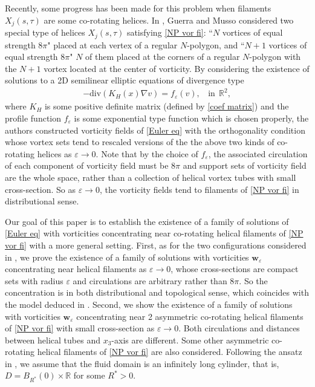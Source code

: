 \documentclass[12pt,reqno]{amsart}
\numberwithin{equation}{section}
\theoremstyle{definition}
\theoremstyle{remark}
\begin{document}
Recently, some progress has been made  for this problem when  filaments $ X_j(s, \tau) $ are some co-rotating helices. In \cite{GM2}, Guerra and Musso considered two special type of  helices $ X_j(s, \tau) $ satisfying \eqref{NP vor fi}: ``$ N $  vortices of equal strength $ 8\pi $" placed at each vertex of a regular $ N $-polygon, and ``$ N + 1 $ vortices   of equal strength $ 8\pi $" $ N $ of them placed at the corners of a regular $ N $-polygon with the $ N + 1 $ vortex   located at the center of vorticity. By considering the existence of solutions to a 2D semilinear elliptic equations of divergence type
\begin{equation*} 
\begin{split}
-\text{div}\left(K_H(x)\nabla v\right)=f_\varepsilon(v) ,\ \ \ \ \text{in}\ \ \mathbb{R}^2,
\end{split}
\end{equation*}
where $ K_H $ is some positive definite matrix (defined by \eqref{coef matrix}) and the profile function $ f_\varepsilon $ is some exponential type function which is chosen properly, the authors constructed vorticity fields of \eqref{Euler eq} with the orthogonality condition whose vortex sets tend to rescaled versions of the   the above two kinds of co-rotating helices as $ \varepsilon\to0. $ Note that by the choice of $ f_\varepsilon $, the associated circulation of each component of vorticity field must be $ 8\pi $ and  support sets of vorticity field are the whole space, rather than a collection of helical vortex tubes with small cross-section. So as $ \varepsilon\to0 $, the vorticity fields tend to filaments of \eqref{NP vor fi} in distributional sense.

Our goal of this paper is to establish the existence of a family of solutions of \eqref{Euler eq}   with vorticities concentrating near co-rotating helical filaments of  \eqref{NP vor fi} with a more general setting. First, as for the two configurations considered in \cite{GM2}, we prove the existence of a family of solutions with vorticities $ \textbf{w}_\varepsilon $ concentrating near helical filaments as $ \varepsilon\to0 $, whose cross-sections are   compact sets with radius $ \varepsilon $ and circulations are arbitrary rather than $8\pi$. So the concentration is in both distributional and topological sense, which coincides with the model deduced in \cite{KMD}. Second, we show the existence of a family of solutions with vorticities $ \textbf{w}_\varepsilon $ concentrating near 2 asymmetric co-rotating helical filaments of \eqref{NP vor fi} with small cross-section as $ \varepsilon\to0 $. Both circulations and  distances between helical tubes and $ x_3 $-axis are different. Some other asymmetric co-rotating helical filaments of \eqref{NP vor fi} are also considered. Following the ansatz in \cite{CW,CW1}, we assume that the fluid domain is an infinitely long cylinder, that is, $ D=B_{R^*}(0)\times\mathbb{R} $ for some $ R^*>0. $
\end{document}
